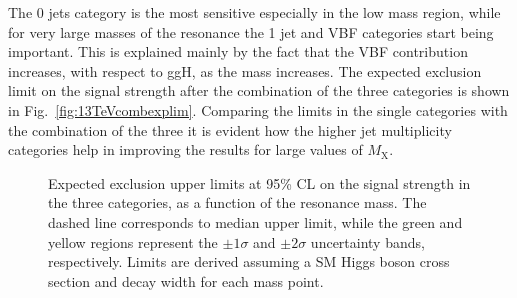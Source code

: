 The 0 jets category is the most sensitive especially in the low mass region, while for very large masses of the resonance the 1 jet and VBF categories start being important. This is explained mainly by the fact that the VBF contribution increases, with respect to ggH, as the mass increases. The expected exclusion limit on the signal strength after the combination of the three categories is shown in Fig.~\ref{fig:13TeVcombexplim}. Comparing the limits in the single categories with the combination of the three it is evident how the higher jet multiplicity categories help in improving the results for large values of $M_\mathrm{X}$.

\begin{figure}[htb]
\centering
{}
\caption{Expected exclusion upper limits at 95\% CL on the signal strength in the three categories, as a function of the resonance mass. The dashed line corresponds to median upper limit, while the green and yellow regions represent the $\pm 1\sigma$ and $\pm 2 \sigma$ uncertainty bands, respectively. Limits are derived assuming a SM Higgs boson cross section and decay width for each mass point.}\label{fig:13TeVexplim}
\end{figure}

